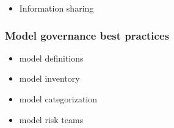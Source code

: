 \documentclass[11pt]{beamer}
\begin{document}
\begin{frame}
\begin{itemize}
\item Information sharing %
\end{itemize}
\end{frame}


\begin{frame}
\frametitle{Model governance best practices}
\begin{itemize}
	\item model definitions
	\item model inventory
	\item model categorization
	\item model risk teams
\end{itemize}
\end{frame}
\end{document}
